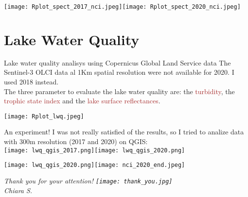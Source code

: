 \documentclass{beamer}
\begin{document}
\begin{frame}
\texttt{\tiny{}}
    \texttt{[image: Rplot\_spect\_2017\_nci.jpeg]}\texttt{[image: Rplot\_spect\_2020\_nci.jpeg]}
\end{frame}

\section{Lake Water Quality}
\begin{frame}{\normalsize{Lake water quality analisys using Copernicus Global Land Service data}}
The Sentinel-3 OLCI data al 1Km spatial resolution were not available for 2020. I used 2018 instead.\\
\smallskip
The three parameter to evaluate the lake water quality are: the \textcolor{brown}{turbidity}, the \textcolor{brown}{trophic state index} and the \textcolor{brown}{lake surface reflectances}.
\texttt{\tiny{}}
\end{frame}

\begin{frame}
\texttt{\tiny{}}
\centering
\texttt{[image: Rplot\_lwq.jpeg]}
\end{frame}

\begin{frame}{An experiment!}
I was not really satisfied of the results, so I tried to analize data with 300m resolution (2017 and 2020) on QGIS:\\
\bigskip
\texttt{[image: lwq\_qgis\_2017.png]}\texttt{[image: lwq\_qgis\_2020.png]}
\end{frame}

\begin{frame}%

\texttt{[image: lwq\_qgis\_2020.png]}\texttt{[image: nci\_2020\_end.jpeg]}
\end{frame}

\begin{frame}
\itshape{\Large{Thank you for your attention!}}
\smallskip
\centering
\texttt{[image: thank\_you.jpg]}\\
\smallskip
\footnotesize{Chiara S.}
\end{frame}
\end{document}
